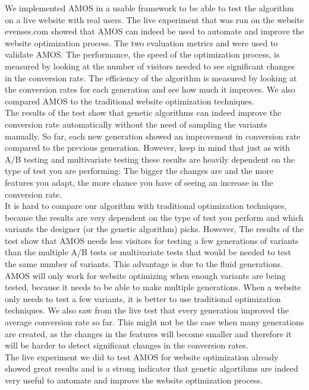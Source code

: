 \documentclass{report}
\begin{document}
We implemented AMOS in a usable framework to be able to test the algorithm on a live website with real users. The live experiment that was run on the website evenses.com showed that AMOS can indeed be used to automate and improve the website optimization process. The two evaluation metrics  and  were used to validate AMOS. The performance, the speed of the optimization process, is measured by looking at the number of visitors needed to see significant changes in the conversion rate. The efficiency of the algorithm is measured by looking at the conversion rates for each generation and see how much it improves. We also compared AMOS to the traditional website optimization techniques.\\

The results of the test show that genetic algorithms can indeed improve the conversion rate automatically without the need of sampling the variants manually. So far, each new generation showed an improvement in conversion rate compared to the previous generation. However, keep in mind that just as with A/B testing and multivariate testing these results are heavily dependent on the type of test you are performing: The bigger the changes are and the more features you adapt, the more chance you have of seeing an increase in the conversion rate.\\

It is hard to compare our algorithm with traditional optimization techniques, because the results are very dependent on the type of test you perform and which variants the designer (or the genetic algorithm) picks. However, The results of the test show that AMOS needs less visitors for testing a few generations of variants than the multiple A/B tests or multivariate tests that would be needed to test the same number of variants. This advantage is due to the fluid generations. AMOS will only work for website optimizing when enough variants are being tested, because it needs to be able to make multiple generations. When a website only needs to test a few variants, it is better to use traditional optimization techniques. We also saw from the live test that every generation improved the average conversion rate so far. This might not be the case when many generations are created, as the changes in the features will become smaller and therefore it will be harder to detect significant changes in the conversion rates.\\

The live experiment we did to test AMOS for website optimization already showed great results and is a strong indicator that genetic algortihms are indeed very useful to automate and improve the website optimization process.\\
\end{document}
